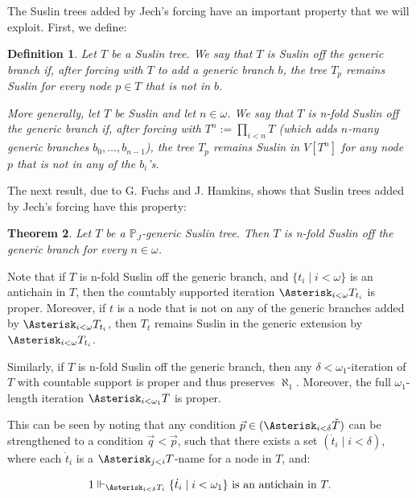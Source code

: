 \documentclass[a4paper,11pt]{article}
\newtheorem{theorem}{Theorem}[section]
\newtheorem{definition}[theorem]{Definition}
\newcommand{\forceP}{\mathbb{P}}
\begin{document}
The Suslin trees added by Jech’s forcing have an important property that we will exploit. First, we define:

\begin{definition}
Let \( T \) be a Suslin tree. We say that \( T \) is \emph{Suslin off the generic branch} if, after forcing with \( T \) to add a generic branch \( b \), the tree \( T_p \) remains Suslin for every node \( p \in T \) that is not in \( b \).

More generally, let \( T \) be Suslin and let \( n \in \omega \). We say that \( T \) is \emph{n-fold Suslin off the generic branch} if, after forcing with \( T^n := \prod_{i < n} T \) (which adds \( n \)-many generic branches \( b_0, \dots, b_{n-1} \)), the tree \( T_p \) remains Suslin in \( V[T^n] \) for any node \( p \) that is not in any of the \( b_i \)'s.
\end{definition}

The next result, due to G. Fuchs and J. Hamkins, shows that Suslin trees added by Jech’s forcing have this property:

\begin{theorem}
Let \( T \) be a \( \forceP_J \)-generic Suslin tree. Then \( T \) is \emph{n-fold Suslin off the generic branch} for every \( n \in \omega \).
\end{theorem}

Note that if \( T \) is n-fold Suslin off the generic branch, and \( \{ t_i \mid i < \omega \} \) is an antichain in \( T \), then the countably supported iteration \( \Asterisk_{i < \omega} T_{t_i} \) is proper. Moreover, if \( t \) is a node that is not on any of the generic branches added by \( \Asterisk_{i < \omega} T_{t_i} \), then \( T_t \) remains Suslin in the generic extension by \( \Asterisk_{i < \omega} T_{t_i} \).

Similarly, if \( T \) is n-fold Suslin off the generic branch, then any \( \delta < \omega_1 \)-iteration of \( T \) with countable support is proper and thus preserves \( \aleph_1 \). Moreover, the full \( \omega_1 \)-length iteration \( \Asterisk_{i < \omega_1} T \) is proper.

This can be seen by noting that any condition \( \vec{p} \in (\Asterisk_{i < \delta} \check{T}) \) can be strengthened to a condition \( \vec{q} < \vec{p} \), such that there exists a set \( (\dot{t}_i \mid i < \delta) \), where each \( \dot{t}_i \) is a \( \Asterisk_{j < i} T \)-name for a node in \( T \), and:

\[
1 \Vdash_{\Asterisk_{i < \delta} T_i} \{ \dot{t}_i \mid i < \omega_1 \} \text{ is an antichain in } T.
\]
\end{document}
